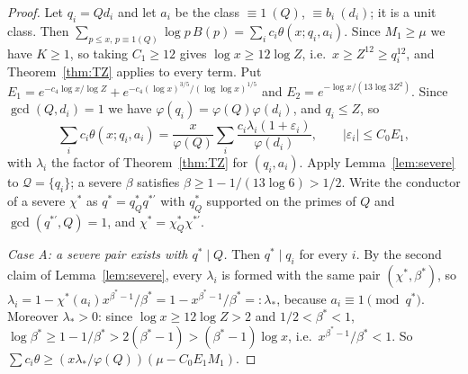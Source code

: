 \documentclass[11pt,reqno]{amsart}
\theoremstyle{definition}
\newcommand{\cQ}{\mathcal Q}
\begin{document}
\begin{proof}
Let $q_i=Qd_i$ and let $a_i$ be the class $\equiv1\ (Q)$, $\equiv b_i\ (d_i)$;
it is a unit class.  Then
$\sum_{p\le x,\,p\equiv1(Q)}\log p\,B(p)=\sum_ic_i\theta(x;q_i,a_i)$.  Since
$M_1\ge\mu$ we have $K\ge1$, so taking $C_1\ge12$ gives
$\log x\ge12\log Z$, i.e.\ $x\ge Z^{12}\ge q_i^{12}$, and
Theorem~\ref{thm:TZ} applies to every term.  Put
$E_1=e^{-c_4\log x/\log Z}+e^{-c_4(\log x)^{3/5}/(\log\log x)^{1/5}}$ and
$E_2=e^{-\log x/(13\log3Z^2)}$.  Since $\gcd(Q,d_i)=1$ we have
$\varphi(q_i)=\varphi(Q)\varphi(d_i)$, and $q_i\le Z$, so
\[
 \sum_ic_i\theta(x;q_i,a_i)=\frac{x}{\varphi(Q)}\sum_i\frac{c_i\lambda_i(1+\varepsilon_i)}{\varphi(d_i)},\qquad
 |\varepsilon_i|\le C_0E_1,
\]
with $\lambda_i$ the factor of Theorem~\ref{thm:TZ} for $(q_i,a_i)$.  Apply
Lemma~\ref{lem:severe} to $\cQ=\{q_i\}$; a severe $\beta$ satisfies
$\beta\ge1-1/(13\log 6)>1/2$.  Write the conductor of a severe $\chi^*$ as $q^*=q^*_Qq^{*\prime}$ with
$q^*_Q$ supported on the primes of $Q$ and $\gcd(q^{*\prime},Q)=1$, and
$\chi^*=\chi^*_Q\chi^{*\prime}$.

\emph{Case A: a severe pair exists with $q^*\mid Q$.}  Then $q^*\mid q_i$ for
every $i$.  By the second claim of Lemma~\ref{lem:severe}, every $\lambda_i$ is
formed with the same pair $(\chi^*,\beta^*)$, so
$\lambda_i=1-\chi^*(a_i)x^{\beta^*-1}/\beta^*=1-x^{\beta^*-1}/\beta^*=:\lambda_*$,
because $a_i\equiv1\pmod{q^*}$.  Moreover $\lambda_*>0$: since $\log x\ge12\log Z>2$ and
$1/2<\beta^*<1$,
$\log\beta^*\ge1-1/\beta^*>2(\beta^*-1)>(\beta^*-1)\log x$, i.e.\
$x^{\beta^*-1}/\beta^*<1$.
So
$\sum c_i\theta\ge(x\lambda_*/\varphi(Q))(\mu-C_0E_1M_1)$.


\end{proof}
\end{document}
